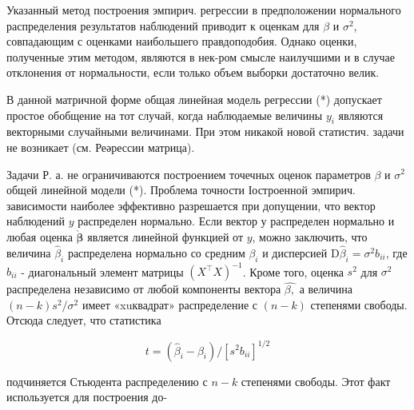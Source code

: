 \documentclass[10pt]{article}
\begin{document}
Указанный метод построения эмпирич. регрессии в предположении нормального распределения результатов наблюдений приводит к оценкам для $\beta$ и $\sigma^{2}$, совпадающим с оценками наибольшего правдоподобия. Однако оценки, полученные этим методом, являются в нек-ром смысле наилучшими и в случае отклонения от нормальности, если только объем выборки достаточно велик.



В данной матричной форме общая линейная модель регрессии (*) допускает простое обобщение на тот случай, когда наблюдаемые величины $y_{i}$ являются векторными случайными величинами. При этом никакой новой статистич. задачи не возникает (см. Реәрессии матрица).



Задачи Р. а. не ограничиваются построением точечных оценок параметров $\beta$ и $\sigma^{2}$ общей линейной модели (*). Проблема точности Іостроенной эмпирич. зависимости наиболее эффективно разрешается при допущении, что вектор наблюдений $y$ распределен нормально. Если вектор у распределен нормально и любая оценка $\grave{\boldsymbol{\beta}}$ является линейной функцией от $y$, можно заключить, что величина $\hat{\beta}_{i}$ распределена нормально со средним $\beta_{i}$ и дисперсией $\mathrm{D} \hat{\beta}_{i}=\sigma^{2} b_{i i}$, где $b_{i i}$ - диагональный элемент матрицы $\left(X^{\top} X\right)^{-1}$. Кроме того, оценка $s^{2}$ для $\sigma^{2}$ распределена независимо от любой компоненты вектора $\hat{\beta,}$ а величина $(n-k) s^{2} / \sigma^{2}$ имеет «xuквадрат» распределение с $(n-k)$ степенями свободы. Отсюда следует, что статистика



\[

t=\left(\widehat{\beta}_{i}-\beta_{i}\right) /\left[s^{2} b_{i i}\right]^{1 / 2}

\]



подчиняется Стьюдента распределению с $n-k$ степенями свободы. Этот факт используется для построения до-
\end{document}
